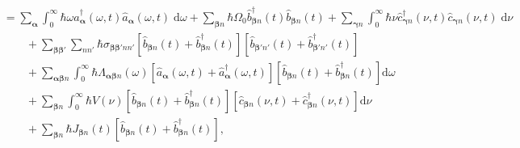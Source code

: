 \documentclass{article}
\begin{document}
\begin{equation}
\begin{split}
&= \sum_{\bm{\alpha}}\int_0^\infty\hbar\omega\hat{a}_{\bm{\alpha}}^\dagger(\omega,t)\hat{a}_{\bm{\alpha}}(\omega,t)\;\mathrm{d}\omega + \sum_{\bm{\beta}n}\hbar\Omega_0\hat{b}_{\bm{\beta}n}^\dagger(t)\hat{b}_{\bm{\beta}n}(t) + \sum_{\bm{\gamma}n}\int_0^\infty\hbar\nu\hat{c}_{\bm{\gamma}n}^\dagger(\nu,t)\hat{c}_{\bm{\gamma}n}(\nu,t)\;\mathrm{d}\nu\\
&\qquad + \sum_{\bm{\beta}\bm{\beta}'}\sum_{nn'}\hbar\sigma_{\bm{\beta}\bm{\beta}'nn'}\left[\hat{b}_{\bm{\beta}n}(t) + \hat{b}_{\bm{\beta}n}^\dagger(t)\right]\left[\hat{b}_{\bm{\beta}'n'}(t) + \hat{b}_{\bm{\beta}'n'}^\dagger(t)\right]\\
&\qquad + \sum_{\bm{\alpha}\bm{\beta}n}\int_0^\infty\hbar\Lambda_{\bm{\alpha}\bm{\beta}n}(\omega)\left[\hat{a}_{\bm{\alpha}}(\omega,t) + \hat{a}_{\bm{\alpha}}^\dagger(\omega,t)\right]\left[\hat{b}_{\bm{\beta}n}(t) + \hat{b}_{\bm{\beta}n}^\dagger(t)\right]\mathrm{d}\omega\\
&\qquad + \sum_{\bm{\beta}n}\int_0^\infty\hbar V(\nu)\left[\hat{b}_{\bm{\beta}n}(t) + \hat{b}_{\bm{\beta}n}^\dagger(t)\right]\left[\hat{c}_{\bm{\beta}n}(\nu,t) + \hat{c}_{\bm{\beta}n}^\dagger(\nu,t)\right]\mathrm{d}\nu\\
&\qquad + \sum_{\bm{\beta}n}\hbar J_{\bm{\beta}n}(t)\left[\hat{b}_{\bm{\beta}n}(t) + \hat{b}_{\bm{\beta}n}^\dagger(t)\right],
\end{split}
\end{equation}
\end{document}
